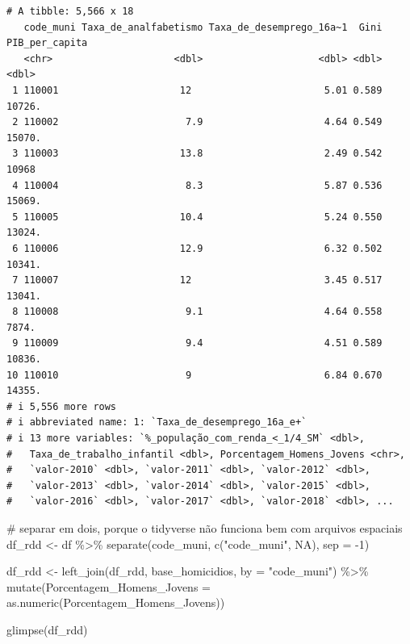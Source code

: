 \documentclass[
  letterpaper,
  DIV=11,
  numbers=noendperiod]{scrartcl}
\newenvironment{Shaded}{\begin{snugshade}}{\end{snugshade}}
\newcommand{\AttributeTok}[1]{\textcolor[rgb]{0.40,0.45,0.13}{#1}}
\newcommand{\CommentTok}[1]{\textcolor[rgb]{0.37,0.37,0.37}{#1}}
\newcommand{\ConstantTok}[1]{\textcolor[rgb]{0.56,0.35,0.01}{#1}}
\newcommand{\DecValTok}[1]{\textcolor[rgb]{0.68,0.00,0.00}{#1}}
\newcommand{\FunctionTok}[1]{\textcolor[rgb]{0.28,0.35,0.67}{#1}}
\newcommand{\NormalTok}[1]{\textcolor[rgb]{0.00,0.23,0.31}{#1}}
\newcommand{\OtherTok}[1]{\textcolor[rgb]{0.00,0.23,0.31}{#1}}
\newcommand{\SpecialCharTok}[1]{\textcolor[rgb]{0.37,0.37,0.37}{#1}}
\newcommand{\StringTok}[1]{\textcolor[rgb]{0.13,0.47,0.30}{#1}}
\begin{document}
\begin{verbatim}
# A tibble: 5,566 x 18
   code_muni Taxa_de_analfabetismo Taxa_de_desemprego_16a~1  Gini PIB_per_capita
   <chr>                     <dbl>                    <dbl> <dbl>          <dbl>
 1 110001                     12                       5.01 0.589         10726.
 2 110002                      7.9                     4.64 0.549         15070.
 3 110003                     13.8                     2.49 0.542         10968 
 4 110004                      8.3                     5.87 0.536         15069.
 5 110005                     10.4                     5.24 0.550         13024.
 6 110006                     12.9                     6.32 0.502         10341.
 7 110007                     12                       3.45 0.517         13041.
 8 110008                      9.1                     4.64 0.558          7874.
 9 110009                      9.4                     4.51 0.589         10836.
10 110010                      9                       6.84 0.670         14355.
# i 5,556 more rows
# i abbreviated name: 1: `Taxa_de_desemprego_16a_e+`
# i 13 more variables: `%_população_com_renda_<_1/4_SM` <dbl>,
#   Taxa_de_trabalho_infantil <dbl>, Porcentagem_Homens_Jovens <chr>,
#   `valor-2010` <dbl>, `valor-2011` <dbl>, `valor-2012` <dbl>,
#   `valor-2013` <dbl>, `valor-2014` <dbl>, `valor-2015` <dbl>,
#   `valor-2016` <dbl>, `valor-2017` <dbl>, `valor-2018` <dbl>, ...
\end{verbatim}

\begin{Shaded}
\begin{Highlighting}[]
\CommentTok{\# separar em dois, porque o tidyverse não funciona bem com arquivos espaciais}
\NormalTok{df\_rdd }\OtherTok{\textless{}{-}}\NormalTok{ df }\SpecialCharTok{\%\textgreater{}\%}
  \FunctionTok{separate}\NormalTok{(code\_muni, }\FunctionTok{c}\NormalTok{(}\StringTok{"code\_muni"}\NormalTok{, }\ConstantTok{NA}\NormalTok{), }\AttributeTok{sep =} \SpecialCharTok{{-}}\DecValTok{1}\NormalTok{)}

\NormalTok{df\_rdd }\OtherTok{\textless{}{-}} \FunctionTok{left\_join}\NormalTok{(df\_rdd, base\_homicidios, }\AttributeTok{by =} \StringTok{"code\_muni"}\NormalTok{) }\SpecialCharTok{\%\textgreater{}\%}
  \FunctionTok{mutate}\NormalTok{(}\StringTok{\textasciigrave{}}\AttributeTok{Porcentagem\_Homens\_Jovens}\StringTok{\textasciigrave{}} \OtherTok{=} \FunctionTok{as.numeric}\NormalTok{(}\StringTok{\textasciigrave{}}\AttributeTok{Porcentagem\_Homens\_Jovens}\StringTok{\textasciigrave{}}\NormalTok{))}

\FunctionTok{glimpse}\NormalTok{(df\_rdd)}
\end{Highlighting}
\end{Shaded}
\end{document}
